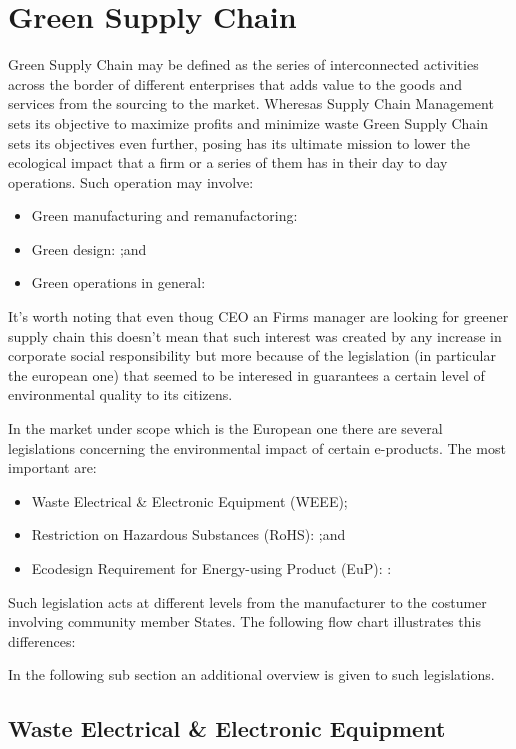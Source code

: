 \documentclass{article}
\begin{document}
\section{Green Supply Chain}
Green Supply Chain may be defined as the series of interconnected activities across the border of different enterprises that adds value to the goods and services from the sourcing to the market. Wheresas Supply Chain Management sets its objective to maximize profits and minimize waste Green Supply Chain sets its objectives even further, posing has its ultimate mission to lower the ecological impact that a firm or a series of them has in their day to day operations. Such operation may involve:
\begin{itemize}
    \item Green manufacturing and remanufactoring:
    \item Green design: ;and
    \item Green operations in general:
\end{itemize}

It's worth noting that even thoug CEO an Firms manager are looking for greener supply chain this doesn't mean that such interest was created by any increase in corporate social responsibility but more because of the legislation (in particular the european one) that seemed to be interesed in guarantees a certain level of environmental quality to its citizens.

In the market under scope which is the European one there are several legislations concerning the environmental impact of certain e-products. The most important are:
\begin{itemize}
    \item Waste Electrical \& Electronic Equipment (WEEE);
    \item Restriction on Hazardous Substances (RoHS): ;and
    \item Ecodesign Requirement for Energy-using Product (EuP): :
\end{itemize}

Such legislation acts at different levels from the manufacturer to the costumer involving community member States. The following flow chart illustrates this differences:

In the following sub section an additional overview is given to such legislations.

\subsection{Waste Electrical \& Electronic Equipment}
\end{document}
